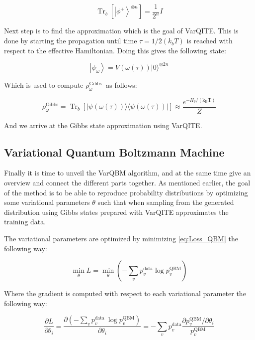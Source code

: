 \documentclass[../main.tex]{subfiles}
\begin{document}
\begin{equation}
\operatorname{Tr}_{b}\left[\left|\phi^{+}\right\rangle^{\otimes n}\right]=\frac{1}{2^{n}} I
\end{equation}

Next step is to find the approximation which is the goal of VarQITE. This is done by starting the propagation until time $\tau=1/2(k_b T)$ is reached with respect to the effective Hamiltonian. Doing this gives the following state:

\begin{equation}
\left|\psi_{\omega}\right\rangle=V(\omega(\tau))|0\rangle^{\otimes 2 n}
\end{equation}

Which is used to compute $\rho_\omega^{\text {Gibbs }}$ as follows:

\begin{equation}
\rho_{\omega}^{\mathrm{Gibbs}}=\operatorname{Tr}_{b}[|\psi(\omega(\tau))\rangle\langle\psi(\omega(\tau))|] \approx \frac{e^{-H_{\theta} /\left(\mathrm{k}_{\mathrm{B}} \mathrm{T}\right)}}{Z}
\end{equation}

And we arrive at the Gibbs state approximation using VarQITE.

\subsection{Variational Quantum Boltzmann Machine}
Finally it is time to unveil the VarQBM algorithm, and at the same time give an overview and connect the different parts together. As mentioned earlier, the goal of the method is to be able to reproduce probability distributions by optimizing some variational parameters $\theta$ such that when sampling from the generated distribution using Gibbs states prepared with VarQITE approximates the training data.

The variational parameters are optimized by minimizing \autoref{eq:Loss_QBM} the following way:

\begin{equation}
\min _{\theta} L=\min _{\theta}\left(-\sum_{v} p_{v}^{\mathrm{data}} \log p_{v}^{\mathrm{QBM}}\right)
\end{equation}

Where the gradient is computed with respect to each variational parameter the following way:

\begin{equation}
\frac{\partial L}{\partial \theta_{i}} =\frac{\partial\left(-\sum_{v} p_{v}^{\text {data }} \log p_{v}^{\mathrm{QBM}}\right)}{\partial \theta_{i}}=-\sum_{v} p_{v}^{\mathrm{data}} \frac{\partial p_{v}^{\mathrm{QBM}} / \partial \theta_{i}}{p_{v}^{\mathrm{QBM}}}
\end{equation}
\end{document}
